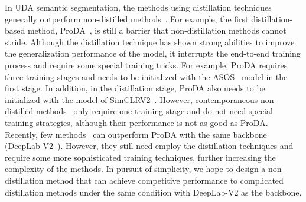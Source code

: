 \documentclass[sigconf]{acmart}
\begin{document}
	
	In UDA semantic segmentation, the methods using distillation techniques~\cite{zhang2021prototypical,zhang2021multiple,wang2021cross,huang2021category} generally outperform non-distilled methods~\cite{melas2021pixmatch,tranheden2021dacs,gao2021dsp,wang2021uncertainty}. For example, the first distillation-based method, ProDA~\cite{zhang2021prototypical}, is still a barrier that non-distillation methods cannot stride. Although the distillation technique has shown strong abilities to improve the generalization performance of the model, it interrupts the end-to-end training process and require some special training tricks. For example, ProDA requires three training stages and needs to be initialized with the ASOS~\cite{tsai2018learning} model in the first stage. In addition, in the distillation stage, ProDA also needs to be initialized with the model of SimCLRV2~\cite{chen2020big}. 
	However, contemporaneous non-distilled methods~\cite{melas2021pixmatch,tranheden2021dacs,gao2021dsp,wang2021uncertainty} only require one training stage and do not need special training strategies, although their performance is not as good as ProDA.
	Recently, few methods~\cite{zhang2021multiple,wang2021cross,huang2021category} can outperform ProDA with the same backbone (DeepLab-V2~\cite{chen2017deeplab}). However, they still need employ the distillation techniques and require some more sophisticated training techniques, further increasing the complexity of the methods. In pursuit of simplicity, we hope to design a non-distillation method that can achieve competitive performance to complicated distillation methods under the same condition with DeepLab-V2 as the backbone.
	
\end{document}
